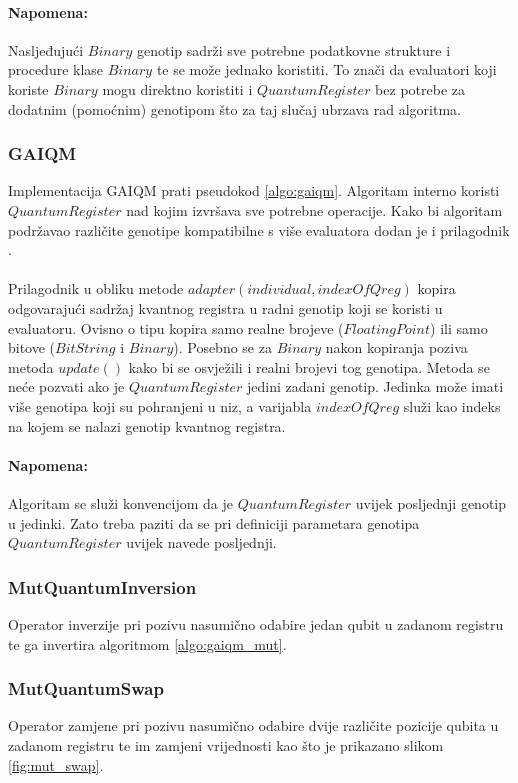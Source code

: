 \documentclass[times, utf8, zavrsni, numeric]{fer}
\begin{document}
\paragraph{Napomena:}
Nasljeđujući $Binary$ genotip sadrži sve potrebne podatkovne strukture i procedure klase $Binary$ te se može jednako koristiti. To znači da evaluatori koji koriste $Binary$ mogu direktno koristiti i $QuantumRegister$ bez potrebe za dodatnim (pomoćnim) genotipom što za taj slučaj ubrzava rad algoritma.

\subsubsection{GAIQM}
Implementacija GAIQM prati pseudokod \ref{algo:gaiqm}. Algoritam interno koristi $QuantumRegister$ nad kojim izvršava sve potrebne operacije. Kako bi algoritam podržavao različite genotipe kompatibilne s više evaluatora dodan je i prilagodnik .

\paragraph{}
Prilagodnik u obliku metode $adapter(individual, indexOfQreg)$ kopira odgovarajući sadržaj kvantnog registra u radni genotip koji se koristi u evaluatoru. Ovisno o tipu kopira samo realne brojeve ($FloatingPoint$) ili samo bitove ($BitString$ i $Binary$). Posebno se za $Binary$ nakon kopiranja poziva metoda $update()$ kako bi se osvježili i realni brojevi tog genotipa. Metoda se neće pozvati ako je $QuantumRegister$ jedini zadani genotip. Jedinka može imati više genotipa koji su pohranjeni u niz, a varijabla $indexOfQreg$ služi kao indeks na kojem se nalazi genotip kvantnog registra. 

\paragraph{Napomena:}
Algoritam se služi konvencijom da je $QuantumRegister$ uvijek posljednji genotip u jedinki. Zato treba paziti da se pri definiciji parametara genotipa $QuantumRegister$ uvijek navede posljednji.

\subsubsection{MutQuantumInversion}
Operator inverzije pri pozivu nasumično odabire jedan qubit u zadanom registru te ga invertira algoritmom \ref{algo:gaiqm_mut}.

\subsubsection{MutQuantumSwap}
Operator zamjene pri pozivu nasumično odabire dvije različite pozicije qubita u zadanom registru te im zamjeni vrijednosti kao što je prikazano slikom \ref{fig:mut_swap}.
\end{document}
